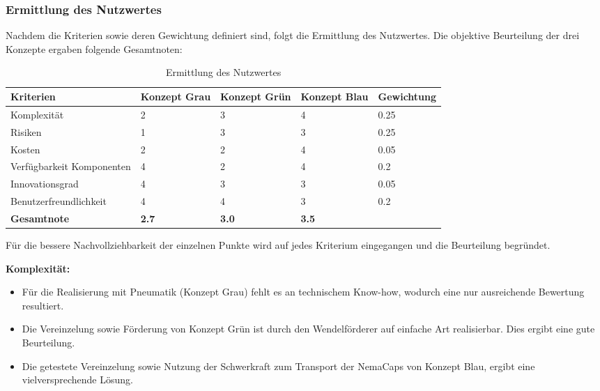 \subsubsection{Ermittlung des Nutzwertes}
\label{nutzwert}
Nachdem die Kriterien sowie deren Gewichtung definiert sind, folgt die Ermittlung des Nutzwertes. Die objektive Beurteilung der drei Konzepte ergaben folgende Gesamtnoten:
\begin{table}[H]
\begin{tabular}{|L{4cm}|C{2.2cm}|C{2.2cm}|C{2.2cm}|C{2.3cm}|}
	\hline 
	\textbf{Kriterien} & \textbf{Konzept Grau} & \textbf{Konzept Grün} & \textbf{Konzept Blau} & \textbf{Gewichtung} \\ 
	\hline 
	Komplexität & 2 & 3 & 4 & 0.25 \\ 
	\hline 
	Risiken & 1 & 3 & 3 & 0.25 \\ 
	\hline 
	Kosten & 2 & 2 & 4 & 0.05 \\ 
	\hline 
	Verfügbarkeit Komponenten & 4 & 2 & 4 & 0.2 \\ 
	\hline 
	Innovationsgrad & 4 & 3 & 3 & 0.05 \\ 
	\hline 
	Benutzerfreundlichkeit & 4 & 4 & 3 & 0.2 \\ 
	\hline 
	\textbf{Gesamtnote} & \textbf{2.7} & \textbf{3.0} & \textbf{3.5} &  \\ 
	\hline 
\end{tabular} 
	\caption{Ermittlung des Nutzwertes}
	\label{tab:nutzwert}
\end{table}

Für die bessere Nachvollziehbarkeit der einzelnen Punkte wird auf jedes Kriterium eingegangen und die Beurteilung begründet.
\newline

\textbf{Komplexität:}
\begin{itemize}
	\item Für die Realisierung mit Pneumatik (Konzept Grau) fehlt es an technischem Know-how, wodurch eine nur ausreichende Bewertung resultiert. 
	
	\item Die Vereinzelung sowie Förderung von Konzept Grün ist durch den Wendelförderer auf einfache Art realisierbar. Dies ergibt eine gute Beurteilung.
	
	\item Die getestete Vereinzelung sowie Nutzung der Schwerkraft zum Transport der NemaCaps von Konzept Blau, ergibt eine vielversprechende Lösung.
\end{itemize}

